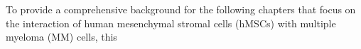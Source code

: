 \documentclass[12pt]{doctoral_thesis_uniwue}
\begin{document}





\newpage


\setcounter{page}{1} %



\newpage



\newpage


{\footnotesize \tableofcontents}
\newpage





\setcounter{page}{1} %

To provide a comprehensive background for the following chapters that focus on
the interaction of human mesenchymal stromal cells (hMSCs) with multiple myeloma
(MM) cells, this




\newpage


\newpage



\newpage



\newpage



\newpage
\end{document}
